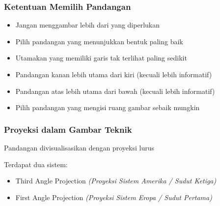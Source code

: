 \documentclass[../gbr_teknik.tex]{subfiles}
\begin{document}
\begin{frame}[mytitle=center,t,mycolor=digiPH_purple,dark]\frametitle{Ketentuan Memilih Pandangan}

	\begin{itemize}
		\item Jangan menggambar lebih dari yang diperlukan
		\item Pilih pandangan yang menunjukkan bentuk paling baik
		\item Utamakan yang memiliki garis tak terlihat paling sedikit
		\item Pandangan kanan lebih utama dari kiri (kecuali lebih informatif)
		\item Pandangan atas lebih utama dari bawah (kecuali lebih informatif)
		\item Pilih pandangan yang mengisi ruang gambar sebaik mungkin
	\end{itemize}
\end{frame}


\begin{frame}[mytitle=standard,t,mycolor=digiPH_gray,light]\frametitle{Proyeksi dalam Gambar Teknik}

	Pandangan divisualisasikan dengan proyeksi lurus

	Terdapat dua sistem:

	\begin{itemize}
		\item Third Angle Projection \textit{(Proyeksi Sistem Amerika / Sudut Ketiga)}
		\item First Angle Projection \textit{(Proyeksi Sistem Eropa / Sudut Pertama)}
	\end{itemize}
\end{frame}



\end{document}
